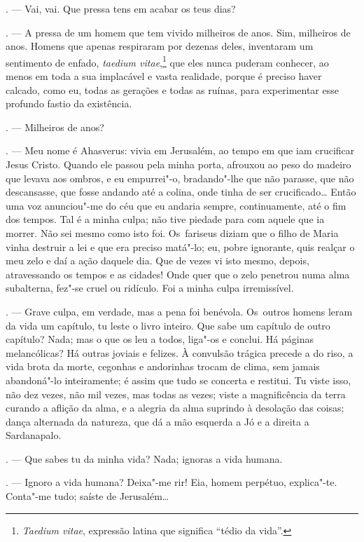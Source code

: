\begin{linenumbers}
\begin{Parskip}
. --- Vai, vai. Que pressa tens em acabar os teus dias?

. --- A pressa de um homem que tem vivido milheiros de anos.
Sim, milheiros de anos. Homens que apenas respiraram por dezenas deles,
inventaram um sentimento de enfado, \emph{taedium vitae},\footnote{\emph{Taedium
  vitae}, expressão latina que significa ``tédio da vida''.} que eles
nunca puderam conhecer, ao menos em toda a sua implacável e vasta
realidade, porque é preciso haver calcado, como eu, todas as gerações e
todas as ruínas, para experimentar esse profundo fastio da existência.

. --- Milheiros de anos?

. --- Meu nome é Ahasverus: vivia em Jerusalém, ao tempo em que
iam crucificar Jesus Cristo. Quando ele passou pela minha porta,
afrouxou ao peso do madeiro que levava aos ombros, e eu empurrei"-o,
bradando"-lhe que não parasse, que não descansasse, que fosse andando até
a colina, onde tinha de ser crucificado\ldots{} Então uma voz anunciou"-me do
céu que eu andaria sempre, continuamente, até o fim dos tempos. Tal é a
minha culpa; não tive piedade para com aquele que ia morrer. Não sei
mesmo como isto foi. Os~fariseus diziam que o filho de Maria vinha
destruir a lei e que era preciso matá"-lo; eu, pobre ignorante, quis
realçar o meu zelo e daí a ação daquele dia. Que de vezes vi isto mesmo,
depois, atravessando os tempos e as cidades! Onde quer que o zelo
penetrou numa alma subalterna, fez"-se cruel ou ridículo. Foi a minha
culpa irremissível.

. --- Grave culpa, em verdade, mas a pena foi benévola. Os~outros
homens leram da vida um capítulo, tu leste o livro inteiro. Que sabe um
capítulo de outro capítulo? Nada; mas o que os leu a todos, liga"-os e
conclui. Há páginas melancólicas? Há outras joviais e felizes. À
convulsão trágica precede a do riso, a vida brota da morte, cegonhas e
andorinhas trocam de clima, sem jamais abandoná"-lo inteiramente; é assim
que tudo se concerta e restitui. Tu viste isso, não dez vezes, não mil
vezes, mas todas as vezes; viste a magnificência da terra curando a
aflição da alma, e a alegria da alma suprindo à desolação das coisas;
dança alternada da natureza, que dá a mão esquerda a Jó e a direita a
Sardanapalo.

. --- Que sabes tu da minha vida? Nada; ignoras a vida humana.

. --- Ignoro a vida humana? Deixa"-me rir! Eia, homem perpétuo,
explica"-te. Conta"-me tudo; saíste de Jerusalém\ldots{}


\end{Parskip}
\end{linenumbers}
